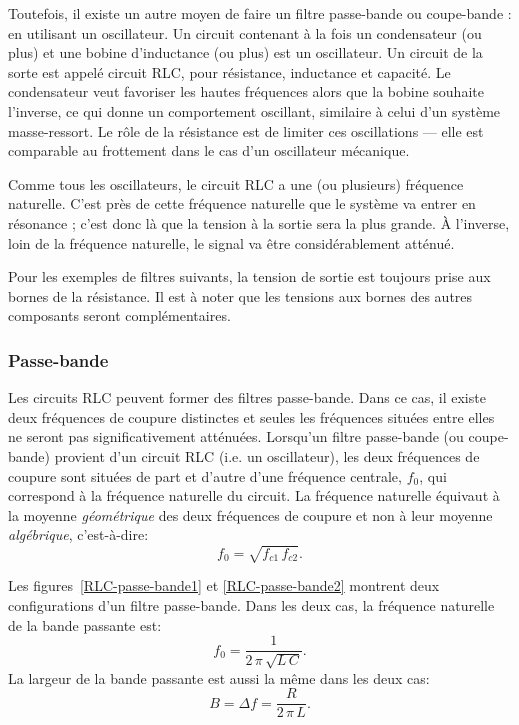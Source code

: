 \documentclass[canadien,12pt,oneside,letterpaper]{article}
\begin{document}
Toutefois, il existe un autre moyen de faire un filtre passe-bande ou coupe-bande : en utilisant un oscillateur. Un circuit contenant à la fois un condensateur (ou plus) et une bobine d'inductance (ou plus) est un oscillateur. Un circuit de la sorte est appelé circuit RLC, pour résistance, inductance et capacité. Le condensateur veut favoriser les hautes fréquences alors que la bobine souhaite l'inverse, ce qui donne un comportement oscillant, similaire à celui d'un système masse-ressort. Le rôle de la résistance est de limiter ces oscillations --- elle est comparable au frottement dans le cas d'un oscillateur mécanique.

Comme tous les oscillateurs, le circuit RLC a une (ou plusieurs) fréquence naturelle. C'est près de cette fréquence naturelle que le système va entrer en résonance ; c'est donc là que la tension à la sortie sera la plus grande. À l'inverse, loin de la fréquence naturelle, le signal va être considérablement atténué.

Pour les exemples de filtres suivants, la tension de sortie est toujours prise aux bornes de la résistance. Il est à noter que les tensions aux bornes des autres composants seront complémentaires.


\subsubsection{Passe-bande}

Les circuits RLC peuvent former des filtres passe-bande. Dans ce cas, il existe deux fréquences de coupure distinctes et seules les fréquences situées entre elles ne seront pas significativement atténuées. Lorsqu'un filtre passe-bande (ou coupe-bande) provient d'un circuit RLC (i.e. un oscillateur), les deux fréquences de coupure sont situées de part et d'autre d'une fréquence centrale, $f_0$, qui correspond à la fréquence naturelle du circuit. La fréquence naturelle équivaut à la moyenne \textit{géométrique} des deux fréquences de coupure et non à leur moyenne \textit{algébrique}, c'est-à-dire:
\begin{equation}
f_0=\sqrt{f_{c1}\,f_{c2}}.
\end{equation}

Les figures~\ref{RLC-passe-bande1} et \ref{RLC-passe-bande2} montrent deux configurations d'un filtre passe-bande. Dans les deux cas, la fréquence naturelle de la bande passante est:
\begin{equation}
\label{eq-passe-bande1}
f_0=\frac{1}{2\,\pi\,\sqrt{L\,C}}.
\end{equation}
La largeur de la bande passante est aussi la même dans les deux cas:
\begin{equation}
\label{eq-passe-bande2}
B=\Delta f=\frac{R}{2\,\pi\,L}.
\end{equation}
\end{document}

